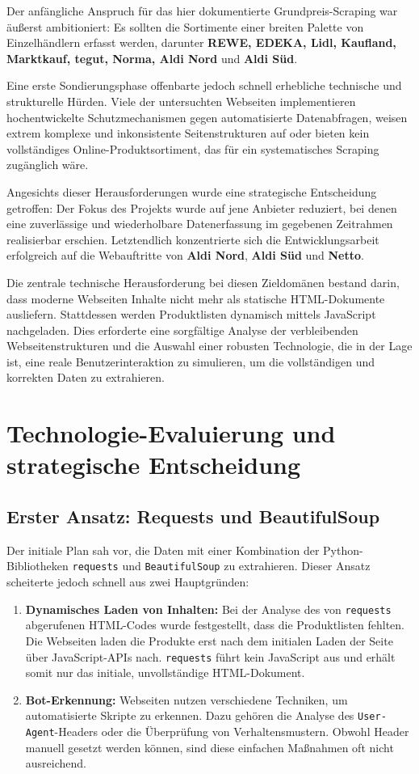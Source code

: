 \documentclass[12pt, a4paper]{report} %
\begin{document}
Der anfängliche Anspruch für das hier dokumentierte Grundpreis-Scraping war äußerst ambitioniert: Es sollten die Sortimente einer breiten Palette von Einzelhändlern erfasst werden, darunter \textbf{REWE, EDEKA, Lidl, Kaufland, Marktkauf, tegut, Norma, Aldi Nord} und \textbf{Aldi Süd}.

Eine erste Sondierungsphase offenbarte jedoch schnell erhebliche technische und strukturelle Hürden. Viele der untersuchten Webseiten implementieren hochentwickelte Schutzmechanismen gegen automatisierte Datenabfragen, weisen extrem komplexe und inkonsistente Seitenstrukturen auf oder bieten kein vollständiges Online-Produktsortiment, das für ein systematisches Scraping zugänglich wäre.

Angesichts dieser Herausforderungen wurde eine strategische Entscheidung getroffen: Der Fokus des Projekts wurde auf jene Anbieter reduziert, bei denen eine zuverlässige und wiederholbare Datenerfassung im gegebenen Zeitrahmen realisierbar erschien. Letztendlich konzentrierte sich die Entwicklungsarbeit erfolgreich auf die Webauftritte von \textbf{Aldi Nord}, \textbf{Aldi Süd} und \textbf{Netto}.

Die zentrale technische Herausforderung bei diesen Zieldomänen bestand darin, dass moderne Webseiten Inhalte nicht mehr als statische HTML-Dokumente ausliefern. Stattdessen werden Produktlisten dynamisch mittels JavaScript nachgeladen. Dies erforderte eine sorgfältige Analyse der verbleibenden Webseitenstrukturen und die Auswahl einer robusten Technologie, die in der Lage ist, eine reale Benutzerinteraktion zu simulieren, um die vollständigen und korrekten Daten zu extrahieren.

\section{Technologie-Evaluierung und strategische Entscheidung}
\subsection{Erster Ansatz: Requests und BeautifulSoup}
Der initiale Plan sah vor, die Daten mit einer Kombination der Python-Bibliotheken \texttt{requests} und \texttt{BeautifulSoup} zu extrahieren. Dieser Ansatz scheiterte jedoch schnell aus zwei Hauptgründen:
\begin{enumerate}
    \item \textbf{Dynamisches Laden von Inhalten:} Bei der Analyse des von \texttt{requests} abgerufenen HTML-Codes wurde festgestellt, dass die Produktlisten fehlten. Die Webseiten laden die Produkte erst nach dem initialen Laden der Seite über JavaScript-APIs nach. \texttt{requests} führt kein JavaScript aus und erhält somit nur das initiale, unvollständige HTML-Dokument.
    \item \textbf{Bot-Erkennung:} Webseiten nutzen verschiedene Techniken, um automatisierte Skripte zu erkennen. Dazu gehören die Analyse des \texttt{User-Agent}-Headers oder die Überprüfung von Verhaltensmustern. Obwohl Header manuell gesetzt werden können, sind diese einfachen Maßnahmen oft nicht ausreichend.
\end{enumerate}
\end{document}
